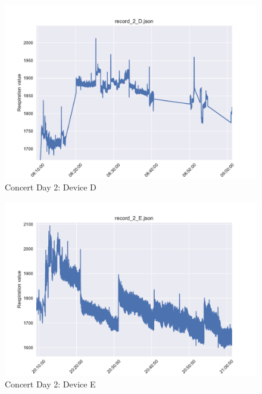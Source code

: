 \begin{figure}
    \centering
    \includegraphics[scale=0.6]{images/record_2_d.pdf}
    \caption{Concert Day 2: Device D}
    \label{fig:concert_day2_d}
\end{figure}

\begin{figure}
    \centering
    \includegraphics[scale=0.6]{images/record_2_e.pdf}
    \caption{Concert Day 2: Device E}
    \label{fig:concert_day2_e}
\end{figure}

